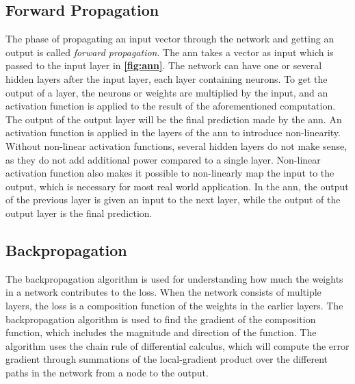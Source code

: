 \subsection{Forward Propagation}
The phase of propagating an input vector through the network and getting an output is called \textit{forward propagation}. The \gls{ann} takes a vector as input which is passed to the input layer in \textbf{\autoref{fig:ann}}. The network can have one or several hidden layers after the input layer, each layer containing neurons. To get the output of a layer, the neurons or weights are multiplied by the input, and an activation function is applied to the result of the aforementioned computation.
The output of the output layer will be the final prediction made by the \gls{ann}.\cite{ann} An activation function is applied in the layers of the \gls{ann} to introduce non-linearity. Without non-linear activation functions, several hidden layers do not make sense, as they do not add additional power compared to a single layer. Non-linear activation function also makes it possible to non-linearly map the input to the output, which is necessary for most real world application.%
In the \gls{ann}, the output of the previous layer is given an input to the next layer, while the output of the output layer is the final prediction.%

\subsection{Backpropagation}

The backpropagation algorithm is used for understanding how much the weights in a network contributes to the loss. When the network consists of multiple layers, the loss is a composition function of the weights in the earlier layers. The backpropagation algorithm is used to find the gradient of the composition function, which includes the magnitude and direction of the function. The algorithm uses the chain rule of differential calculus, which will compute the error gradient through summations of the local-gradient product over the different paths in the network from a node to the output. %


